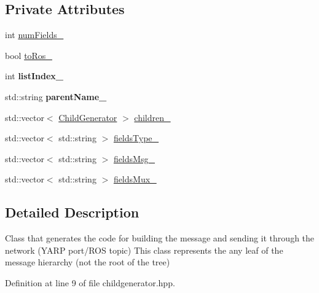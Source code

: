 \subsection*{Private Attributes}
\begin{DoxyCompactItemize}
\item 
int \hyperlink{classChildGenerator_ad485f88e3559a3643c700f8c39e76035}{num\-Fields\-\_\-}
\item 
bool \hyperlink{classChildGenerator_a7b1a36a6a5679fbd2d54682b6cb0527b}{to\-Ros\-\_\-}
\item 
\hypertarget{classChildGenerator_a2d90e8fefb81ef4eb34c7d114e23baae}{int {\bfseries list\-Index\-\_\-}}\label{classChildGenerator_a2d90e8fefb81ef4eb34c7d114e23baae}

\item 
\hypertarget{classChildGenerator_a7958558445170f12ee568c7b3c730b4b}{std\-::string {\bfseries parent\-Name\-\_\-}}\label{classChildGenerator_a7958558445170f12ee568c7b3c730b4b}

\item 
std\-::vector$<$ \hyperlink{classChildGenerator}{Child\-Generator} $>$ \hyperlink{classChildGenerator_ab54bc0742dc6acaf310afb296a154a96}{children\-\_\-}
\item 
std\-::vector$<$ std\-::string $>$ \hyperlink{classChildGenerator_a410cf2b350df1977ac4679bb608859cf}{fields\-Type\-\_\-}
\item 
std\-::vector$<$ std\-::string $>$ \hyperlink{classChildGenerator_a6e4d1e3a323027b3e4277b385b483688}{fields\-Msg\-\_\-}
\item 
std\-::vector$<$ std\-::string $>$ \hyperlink{classChildGenerator_aeb69f47a9b38b931c8c8fdef61d0a4eb}{fields\-Mux\-\_\-}
\end{DoxyCompactItemize}


\subsection{Detailed Description}
Class that generates the code for building the message and sending it through the network (Y\-A\-R\-P port/\-R\-O\-S topic) This class represents the any leaf of the message hierarchy (not the root of the tree) 

Definition at line 9 of file childgenerator.\-hpp.



